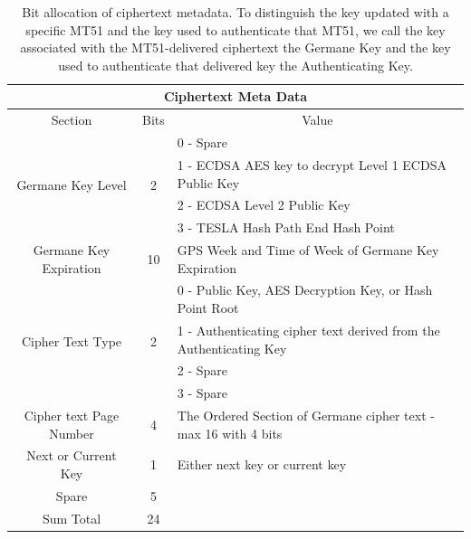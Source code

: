 \documentclass[letterpaper,times]{IONconf/IONconf}
\begin{document}
\begin{table}[H]
\center
\begin{tabular}{|c|c|l|} \hline
	\multicolumn{3}{|c|}{Ciphertext Meta Data} \\ \hline
	Section & Bits & \multicolumn{1}{|c|}{Value} \\ \hline
	\multirow{4}{*}{Germane Key Level} & \multirow{4}{*}{2} & 0 - Spare \\ 
	& & 1 - ECDSA AES key to decrypt Level 1 ECDSA Public Key \\
	& & 2 - ECDSA Level 2 Public Key \\
	& & 3 - TESLA Hash Path End Hash Point \\ \hline
	Germane Key Expiration & 10 & GPS Week and Time of Week of Germane Key Expiration \\ \hline
	\multirow{4}{*}{Cipher Text Type} & \multirow{4}{*}{2} & 0 - Public Key, AES Decryption Key, or Hash Point Root \\
	& & 1 - Authenticating cipher text derived from the Authenticating Key \\ 
	& & 2 - Spare \\ 
	& & 3 - Spare \\ \hline
	Cipher text Page Number & 4 & The Ordered Section of Germane cipher text - max 16 with 4 bits\\ \hline
	Next or Current Key & 1 & Either next key or current key \\ \hline
	Spare & 5 & \\ \hline
	Sum Total & 24 & \\ \hline
\end{tabular}
\caption{Bit allocation of ciphertext metadata. To distinguish the key updated with a specific MT51 and the key used to authenticate that MT51, we call the key associated with the MT51-delivered ciphertext the Germane Key and the key used to authenticate that delivered key the Authenticating Key.}
\label{tab: meta-data table1}
\end{table}
\end{document}
